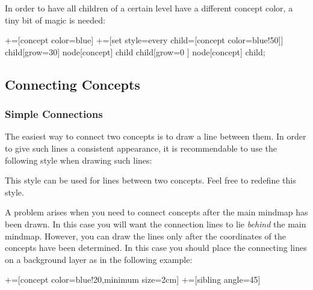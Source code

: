 \begin{itemize}
  In order to have all children of a certain level have a different
  concept color, a tiny bit of magic is needed:
\begin{codeexample}[]
+=[concept color=blue]    
+=[set style={{every child}=[concept color=blue!50]}]    
\tikz[mindmap,text=white]
    child[grow=30] {node[concept] {child}}
    child[grow=0 ] {node[concept] {child}};
\end{codeexample}
\end{itemize}

\subsection{Connecting Concepts}

\subsubsection{Simple Connections}

The easiest way to connect two concepts is to draw a line between
them. In order to give such lines a consistent appearance, it is
recommendable to use the following style when drawing such lines:

\begin{itemize}
  This style can be used for lines between two concepts. Feel free to
  redefine this style.
\end{itemize}

A problem arises when you need to connect concepts after the main
mindmap has been drawn. In this case you will want the connection
lines to lie \emph{behind} the main mindmap. However, you can draw the
lines only after the coordinates of the concepts have been
determined. In this case you should place the connecting lines on a
background layer as in the following example:

\begin{codeexample}[]
+=[concept color=blue!20,minimum size=2cm]    
+=[sibling angle=45]
\end{codeexample}


